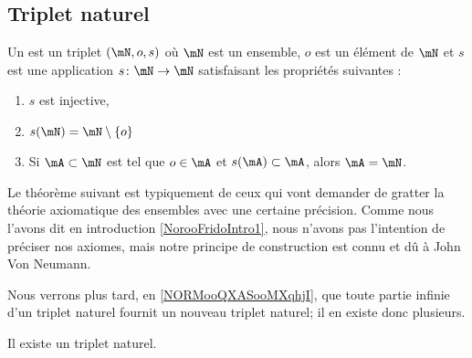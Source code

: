 \subsection{Triplet naturel}
\label{SUBooTripletNaturel}

\begin{definition}     \label{DEFooBJBOooWlblAx}
	Un  est un triplet \( (\mN, o, s)\) où \( \mN\) est un ensemble, \( o\) est un élément de \( \mN\) et \( s\) est une application \( s\colon \mN\to \mN\) satisfaisant les propriétés suivantes :
	\begin{enumerate}
		\item
		      \( s\) est injective,
		\item       \label{ITEMooQAKJooGKdJsM}
		      \( s(\mN)=\mN\setminus \{ o \} \)
		\item       \label{ITEMooXPYEooFajywh}
		      Si \( \mA\subset \mN\) est tel que \( o\in \mA\) et \( s(\mA)\subset \mA\), alors \( \mA=\mN\).
	\end{enumerate}
\end{definition}

\begin{normaltext}	\label{NORMooTripletNaturelGratterTheoEns}
	Le théorème suivant est typiquement de ceux qui vont demander de gratter la théorie axiomatique des ensembles avec une certaine précision. Comme nous l'avons dit en introduction \ref{NorooFridoIntro1}, nous n'avons pas l'intention de préciser nos axiomes, mais notre principe de construction est connu et dû à John Von Neumann.

	Nous verrons plus tard, en \ref{NORMooQXASooMXqhjI}, que toute partie infinie d'un triplet naturel fournit un nouveau triplet naturel; il en existe donc plusieurs.
\end{normaltext}

\begin{theorem}     \label{THOooOXMHooXYgMqb}
	Il existe un triplet naturel.
\end{theorem}

